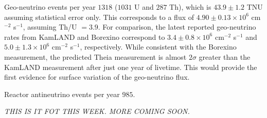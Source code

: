 Geo-neutrino events per year $1318$ ($1031$ U and $287$ Th), which is $43.9 \pm 1.2$ TNU assuming statistical error only. This corresponds to a flux of $4.90 \pm 0.13 \times 10^6$ cm$^{-2}$ s$^{-1}$, assuming Th/U $=3.9$. For comparison, the latest reported geo-neutrino rates from KamLAND and Borexino correspond to $3.4 \pm 0.8 \times 10^6$ cm$^{-2}$ s$^{-1}$ and $5.0 \pm 1.3 \times 10^6$ cm$^{-2}$ s$^{-1}$, respectively. While consistent with the Borexino measurement, the predicted Theia measurement is almost $2 \sigma$ greater than the KamLAND measurement after just one year of livetime. This would provide the first evidence for surface variation of the geo-neutrino flux.


Reactor antineutrino events per year $985$.

\it THIS IS IT FOT THIS WEEK. MORE COMING SOON.

